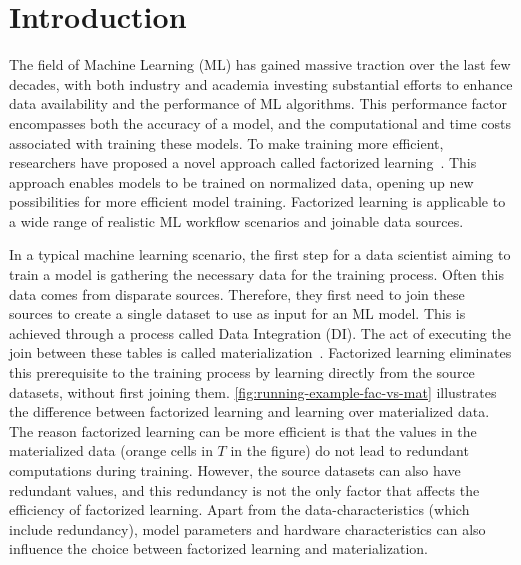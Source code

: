 
\chapter{Introduction}
\label{chapter:introduction}

The field of Machine Learning (ML) has gained massive traction over the last few decades, with both industry and academia investing substantial efforts to enhance data availability and the performance of ML algorithms. This performance factor encompasses both the accuracy of a model, and the computational and time costs associated with training these models.  To make training more efficient, researchers have proposed a novel approach called factorized learning~\cite{orion_learning_gen_lin_models}. This approach enables models to be trained on normalized data, opening up new possibilities for more efficient model training. Factorized learning is applicable to a wide range of realistic ML workflow scenarios and joinable data sources.

In a typical machine learning scenario, the first step for a data scientist aiming to train a model is gathering the necessary data for the training process. Often this data comes from disparate sources. Therefore, they first need to join these sources to create a single dataset to use as input for an ML model. This is achieved through a process called Data Integration (DI). The act of executing the join between these tables is called materialization~\cite{rel_db_glossary}. Factorized learning eliminates this prerequisite to the training process by learning directly from the source datasets, without first joining them. \autoref{fig:running-example-fac-vs-mat} illustrates the difference between factorized learning and learning over materialized data. The reason factorized learning can be more efficient is that the values in the materialized data (orange cells in $T$ in the figure) do not lead to redundant computations during training. However, the source datasets can also have redundant values, and this redundancy is not the only factor that affects the efficiency of factorized learning. Apart from the data-characteristics (which include redundancy), model parameters and hardware characteristics can also influence the choice between factorized learning and materialization.

